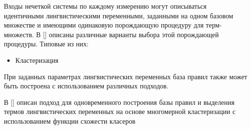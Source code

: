 Входы нечеткой системы по каждому измерению могут описываться идентичными лингвистическими переменными, заданными на одном базовом множестве и имеющими одинаковую порождающую процедуру для терм-множеств. В [] описаны различные варианты выбора этой порождающей процедуры. Типовые из них:
\begin{itemize}
\item Кластеризация
\end{itemize}

При заданных параметрах лингвистических переменных база правил также может быть построена с использованием различных подходов.

В [] описан подход для одновременного построения базы правил и выделения термов лингвистических переменных на основе многомерной кластеризации с использованием функции схожести класеров 




\FloatBarrier
